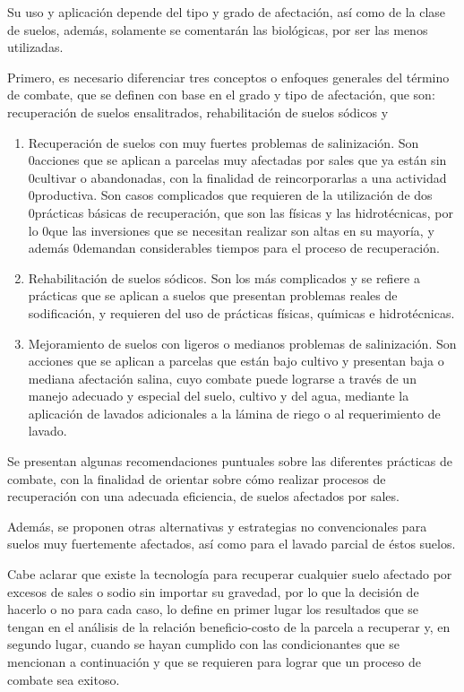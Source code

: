 Su uso y aplicación depende del tipo y grado de afectación, así como de la clase de suelos, además, solamente se comentarán las biológicas, por ser las menos utilizadas.

Primero, es necesario diferenciar tres conceptos o enfoques generales del término de combate, que se definen con base en el grado y tipo de afectación, que son: recuperación de suelos ensalitrados, rehabilitación de suelos sódicos y

\begin{enumerate}
    \item Recuperación de suelos con muy fuertes problemas de salinización. Son 0acciones que se aplican a parcelas muy afectadas por sales que ya están sin 0cultivar o abandonadas, con la finalidad de reincorporarlas a una actividad 0productiva. Son casos complicados que requieren de la utilización de dos 0prácticas básicas de recuperación, que son las físicas y las hidrotécnicas, por lo 0que las inversiones que se necesitan realizar son altas en su mayoría, y además 0demandan considerables tiempos para el proceso de recuperación.
    \item Rehabilitación de suelos sódicos. Son los más complicados y se refiere a prácticas que se aplican a suelos que presentan problemas reales de sodificación, y requieren del uso de prácticas físicas, químicas e hidrotécnicas.
    \item Mejoramiento de suelos con ligeros o medianos problemas de salinización. Son acciones que se aplican a parcelas que están bajo cultivo y presentan baja o mediana afectación salina, cuyo combate puede lograrse a través de un manejo adecuado y especial del suelo, cultivo y del agua, mediante la aplicación de lavados adicionales a la lámina de riego o al requerimiento de lavado.
\end{enumerate}

Se presentan algunas recomendaciones puntuales sobre las diferentes prácticas de combate, con la finalidad de orientar sobre cómo realizar procesos de recuperación con una adecuada eficiencia, de suelos afectados por sales.

Además, se proponen otras alternativas y estrategias no convencionales para suelos muy fuertemente afectados, así como para el lavado parcial de éstos suelos.

Cabe aclarar que existe la tecnología para recuperar cualquier suelo afectado por excesos de sales o sodio sin importar su gravedad, por lo que la decisión de hacerlo o no para cada caso, lo define en primer lugar los resultados que se tengan en el análisis de la relación beneficio-costo de la parcela a recuperar y, en segundo lugar, cuando se hayan cumplido con las condicionantes que se mencionan a continuación y que se requieren para lograr que un proceso de combate sea exitoso.

